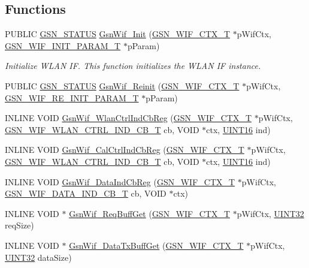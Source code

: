 \subsection*{Functions}
\begin{DoxyCompactItemize}
\item 
PUBLIC \hyperlink{a00660_gada5951904ac6110b1fa95e51a9ddc217}{GSN\_\-STATUS} \hyperlink{a00635_ga1ffa97473da0d308f2f3d214c775c8da}{GsnWif\_\-Init} (\hyperlink{a00323}{GSN\_\-WIF\_\-CTX\_\-T} $\ast$pWifCtx, \hyperlink{a00338}{GSN\_\-WIF\_\-INIT\_\-PARAM\_\-T} $\ast$pParam)
\begin{DoxyCompactList}\small\item\em Initialize WLAN IF. This function initializes the WLAN IF instance. \end{DoxyCompactList}\item 
PUBLIC \hyperlink{a00660_gada5951904ac6110b1fa95e51a9ddc217}{GSN\_\-STATUS} \hyperlink{a00605_a585055eb6eb3ace4e68ae9064372f765}{GsnWif\_\-Reinit} (\hyperlink{a00323}{GSN\_\-WIF\_\-CTX\_\-T} $\ast$pWifCtx, \hyperlink{a00342}{GSN\_\-WIF\_\-RE\_\-INIT\_\-PARAM\_\-T} $\ast$pParam)
\item 
INLINE VOID \hyperlink{a00605_aaa5125848d544a020aeb27a068b0f4fc}{GsnWif\_\-WlanCtrlIndCbReg} (\hyperlink{a00323}{GSN\_\-WIF\_\-CTX\_\-T} $\ast$pWifCtx, \hyperlink{a00635_ga1a6c66e709c29a827dc0c07e40f4b9aa}{GSN\_\-WIF\_\-WLAN\_\-CTRL\_\-IND\_\-CB\_\-T} cb, VOID $\ast$ctx, \hyperlink{a00660_ga09f1a1fb2293e33483cc8d44aefb1eb1}{UINT16} ind)
\item 
INLINE VOID \hyperlink{a00605_a5a748562dc49c19d203f0ba8fc213c21}{GsnWif\_\-CalCtrlIndCbReg} (\hyperlink{a00323}{GSN\_\-WIF\_\-CTX\_\-T} $\ast$pWifCtx, \hyperlink{a00635_ga1a6c66e709c29a827dc0c07e40f4b9aa}{GSN\_\-WIF\_\-WLAN\_\-CTRL\_\-IND\_\-CB\_\-T} cb, VOID $\ast$ctx, \hyperlink{a00660_ga09f1a1fb2293e33483cc8d44aefb1eb1}{UINT16} ind)
\item 
INLINE VOID \hyperlink{a00605_ac51cadef467511106c44f9bdd2caf325}{GsnWif\_\-DataIndCbReg} (\hyperlink{a00323}{GSN\_\-WIF\_\-CTX\_\-T} $\ast$pWifCtx, \hyperlink{a00635_gad46de129691b078bd6ff8df7f46318d2}{GSN\_\-WIF\_\-DATA\_\-IND\_\-CB\_\-T} cb, VOID $\ast$ctx)
\item 
INLINE VOID $\ast$ \hyperlink{a00605_a6671a7e2a8f70bf6a480f6ce80555289}{GsnWif\_\-ReqBuffGet} (\hyperlink{a00323}{GSN\_\-WIF\_\-CTX\_\-T} $\ast$pWifCtx, \hyperlink{a00660_gae1e6edbbc26d6fbc71a90190d0266018}{UINT32} reqSize)
\item 
INLINE VOID $\ast$ \hyperlink{a00605_a8af797eb7346dc831aabb64057406cd3}{GsnWif\_\-DataTxBuffGet} (\hyperlink{a00323}{GSN\_\-WIF\_\-CTX\_\-T} $\ast$pWifCtx, \hyperlink{a00660_gae1e6edbbc26d6fbc71a90190d0266018}{UINT32} dataSize)

\end{DoxyCompactItemize}
